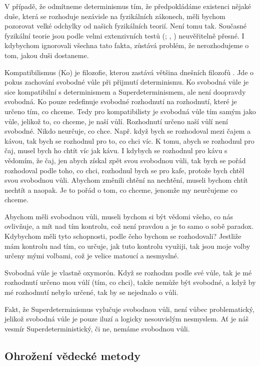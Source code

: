 V případě, že odmítneme determinismus tím, že předpokládáme existenci nějaké duše, která se rozhoduje nezávisle na fyzikálních zákonech, měli bychom pozorovat velké odchylky od našich fyzikálních teorií. Není tomu tak. Současné fyzikální teorie jsou podle velmi extenzivních testů (\cite{GenRelAcc}; , \cite*{QEDAcc}) neuvěřitelně přesné. I kdybychom ignorovali všechna tato fakta, zůstává problém, že nerozhodujeme o tom, jakou duši dostaneme.

Kompatibilismus (Ko) je filozofie, kterou zastává většina dnešních filozofů \parencite{FWSur}. Jde o pokus zachování svobodné vůle při přijmutí determinismu. Ko svobodná vůle je sice kompatibilní s determinismem a Superdeterminismem, ale není doopravdy svobodná. Ko pouze redefinuje svobodné rozhodnutí na rozhodnutí, které je určeno tím, co chceme. Tedy pro kompatibilisty je svobodná vůle tím samým jako vůle, jelikož to, co chceme, je naší vůlí. Rozhodnutí určeno naší vůlí není svobodné. Nikdo neurčuje, co chce. Např. když bych se rozhodoval mezi čajem a kávou, tak bych se rozhodnul pro to, co chci víc. K tomu, abych se rozhodnul pro čaj, musel bych ho chtít víc jak kávu. I kdybych se rozhodnul pro kávu s vědomím, že  čaj, jen abych získal zpět svou svobodnou vůli, tak bych se pořád rozhodoval podle toho, co chci, rozhodnul bych se pro kafe, protože bych chtěl  svou svobodnou vůli. Abychom změnili chtění na nechtění, museli bychom chtít nechtít a naopak. Je to pořád o tom, co chceme, jenomže my neurčujeme co chceme.

Abychom měli svobodnou vůli, museli bychom si být vědomi všeho, co nás ovlivňuje, a mít nad tím kontrolu, což není pravdou a je to samo o sobě paradox. Kdybychom měli tyto schopnosti, podle čeho bychom se rozhodovali? Jestliže mám kontrolu nad tím, co určuje, jak tuto kontrolu využiji, tak jsou moje volby určeny mými volbami, což je velice matoucí a nesmyslné.

Svobodná vůle je vlastně oxymorón. Když se rozhodnu podle své vůle, tak je mé rozhodnutí určeno mou vůlí (tím, co chci), takže nemůže být svobodné, a když by mé rozhodnutí nebylo určené, tak by se nejednalo o vůli.

Fakt, že Superdeterminismus vylučuje svobodnou vůli, není vůbec problematický, jelikož svobodná vůle je pouze iluzí a logicky nesouvislým nesmyslem. Ať je náš vesmír Superdeterministický, či ne, nemáme svobodnou vůli.

\clearpage

\subsection{Ohrožení vědecké metody}

